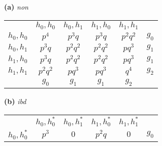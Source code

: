 \begin{table}[!b]
\begin{minipage}{0.5\textwidth}
\quad\textbf{(a)} \emph{non} \\[0.5em]
\begin{tabular}[t]{c|c|c|c|c|c}
\multicolumn{1}{c}{\rule[-1.5ex]{0pt}{0pt}} &
\multicolumn{1}{c}{$h_{0}, h_{0}$} &
\multicolumn{1}{c}{$h_{0}, h_{1}$} &
\multicolumn{1}{c}{$h_{1}, h_{0}$} &
\multicolumn{1}{c}{$h_{1}, h_{1}$} &
\multicolumn{1}{c}{} \\ \cline{2-5}
\rule{0pt}{3ex}\rule[-2ex]{0pt}{0pt}
  $h_{0}, h_{0}$   & $p^{4}$       & $p^{3}q$      & $p^{3}q$      & $p^{2}q^{2}$ & $g_{0}$ \\ \cline{2-5}
\rule{0pt}{3ex}\rule[-2ex]{0pt}{0pt}
  $h_{0}, h_{1}$   & $p^{3}q$      & $p^{2}q^{2}$  & $p^{2}q^{2}$  & $pq^{3}$     & $g_{1}$ \\ \cline{2-5}
\rule{0pt}{3ex}\rule[-2ex]{0pt}{0pt}
  $h_{1}, h_{0}$   & $p^{3}q$      & $p^{2}q^{2}$  & $p^{2}q^{2}$  & $pq^{3}$     & $g_{1}$ \\ \cline{2-5}
\rule{0pt}{3ex}\rule[-2ex]{0pt}{0pt}
  $h_{1}, h_{1}$   & $p^{2}q^{2}$  & $pq^{3}$      & $pq^{3}$      & $q^{4}$      & $g_{2}$ \\ \cline{2-5}
\multicolumn{1}{c}{} &
\multicolumn{1}{c}{$g_{0}$} &
\multicolumn{1}{c}{$g_{1}$} &
\multicolumn{1}{c}{$g_{1}$} &
\multicolumn{1}{c}{$g_{2}$} &
\multicolumn{1}{c}{}
\end{tabular}
\end{minipage}
%
\begin{minipage}{0.5\textwidth}
\quad\textbf{(b)} \emph{ibd} \\[0.5em]
\begin{tabular}[t]{c|c|c|c|c|c}
\multicolumn{1}{c}{\rule[-1.5ex]{0pt}{0pt}} &
\multicolumn{1}{c}{$h_{0}, h^*_{0}$} &
\multicolumn{1}{c}{$h_{0}, h^*_{1}$} &
\multicolumn{1}{c}{$h_{1}, h^*_{0}$} &
\multicolumn{1}{c}{$h_{1}, h^*_{1}$} &
\multicolumn{1}{c}{} \\ \cline{2-5}
\rule{0pt}{3ex}\rule[-2ex]{0pt}{0pt}
  $h_{0}, h^*_{0}$   & $p^{3}$   & $0$       & $p^{2}q$  & $0$       & $g_{0}$ \\ \cline{2-5}

\end{tabular}
\end{minipage}
\end{table}
